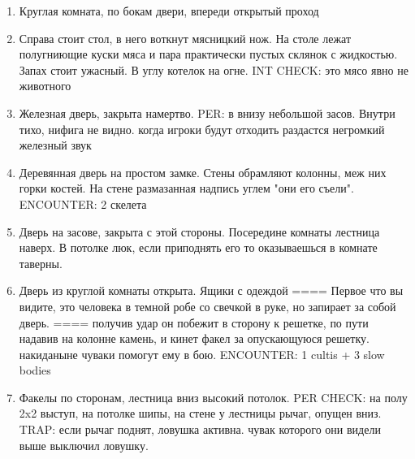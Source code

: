 \documentclass[a5paper,11pt]{book}
\begin{document}
\begin{multicols}{2}
\begin{enumerate}
\item Круглая комната, по бокам двери, впереди открытый проход
\item Справа стоит стол, в него воткнут мясницкий нож. На столе лежат полугниющие куски мяса и пара практически пустых склянок с жидкостью. Запах стоит ужасный. В углу котелок на огне. INT CHECK: это мясо явно не животного
\item Железная дверь, закрыта намертво. PER: в внизу небольшой засов. Внутри тихо, нифига не видно. когда игроки будут отходить раздастся негромкий железный звук
\item Деревянная дверь на простом замке. Стены обрамляют колонны, меж них горки костей. На стене размазанная надпись углем "они его съели". ENCOUNTER: 2 скелета
\item Дверь на засове, закрыта с этой стороны. Посередине комнаты лестница наверх. В потолке люк, если приподнять его то оказываешься в комнате таверны.
\item Дверь из круглой комнаты открыта. Ящики с одеждой ==== Первое что вы видите, это человека в темной робе со свечкой в руке, но запирает за собой дверь. ==== получив удар он побежит в сторону к решетке, по пути надавив на колонне камень, и кинет факел за опускающуюся решетку. накиданыне чуваки помогут ему в бою. ENCOUNTER: 1 cultis + 3 slow bodies 
\item Факелы по сторонам, лестница вниз высокий потолок. PER CHECK: на полу 2x2 выступ,  на потолке шипы, на стене у лестницы рычаг, опущен вниз. TRAP: если рычаг поднят, ловушка активна. чувак которого они видели выше выключил ловушку.
\end{enumerate}


\end{multicols}
\end{document}
